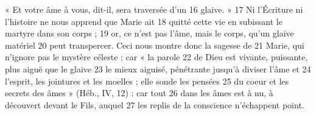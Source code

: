« Et votre âme à vous, dit-il, sera traversée d'un	 
16	 	glaive. »	 
17	 	Ni l'Écriture ni l'histoire ne nous apprend que Marie ait	 
18	 	quitté cette vie en subissant le martyre dans son corps ;	 
19	 	or, ce n'est pas l'âme, mais le corps, qu'un glaive matériel	 
20	 	peut transpercer. Ceci nous montre donc la sagesse de	 
21	 	Marie, qui n'ignore pas le mystère céleste ; car « la parole	 
22	 	de Dieu est vivante, puissante, plus aiguë que le glaive	 
23	 	le mieux aiguisé, pénétrante jusqu'à diviser l'âme et	 
24	 	l'esprit, les jointures et les moelles ; elle sonde les pensées	 
25	 	du coeur et les secrets des âmes » (Héb., IV, 12) : car tout	 
26	 	dans les âmes est à nu, à découvert devant le Fils, auquel	 
27	 	les replis de la conscience n'échappent point.